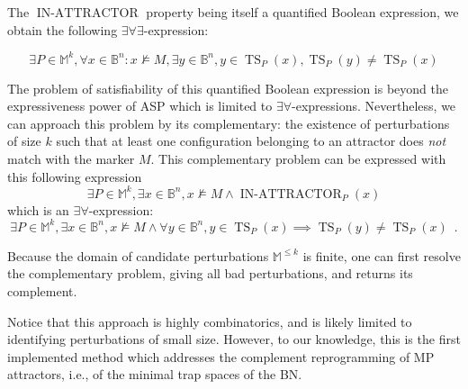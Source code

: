 \documentclass[PCJ,Unicode,screen,mode=plain]{cedram}
\begin{document}
The \(\operatorname{IN-ATTRACTOR}\) property being itself a quantified
Boolean expression, we obtain the following
\(\exists\forall\exists\)-expression:

\begin{equation}
\exists P\in\mathbb M^k, \forall x\in\mathbb B^n: x\not\models M, \exists y\in\mathbb B^n,
   y\in \operatorname{TS}_P(x), \operatorname{TS}_P(y) \neq \operatorname{TS}_P(x)
\end{equation}

The problem of satisfiability of this quantified Boolean expression is
beyond the expressiveness power of ASP which is limited to
\(\exists\forall\)-expressions. Nevertheless, we can approach this
problem by its complementary: the existence of perturbations of size
\(k\) such that at least one configuration belonging to an attractor
does \emph{not} match with the marker \(M\). This complementary problem
can be expressed with this following expression \begin{equation}
\exists P\in\mathbb M^k, \exists x\in\mathbb B^n,x\not\models M \wedge \operatorname{IN-ATTRACTOR}_P(x)
\end{equation} which is an \(\exists\forall\)-expression:
\begin{equation}
\exists P\in\mathbb M^k, \exists x\in\mathbb B^n, x\not\models M\wedge \forall y\in\mathbb B^n, y\in \operatorname{TS}_P(x) \implies \operatorname{TS}_P(y) \neq \operatorname{TS}_P(x)
\enspace.
\end{equation}

Because the domain of candidate perturbations \(\mathbb M^{\leq k}\) is
finite, one can first resolve the complementary problem, giving all bad
perturbations, and returns its complement.

Notice that this approach is highly combinatorics, and is likely limited
to identifying perturbations of small size. However, to our knowledge,
this is the first implemented method which addresses the complement
reprogramming of MP attractors, i.e., of the minimal trap spaces of the
BN.
\end{document}
